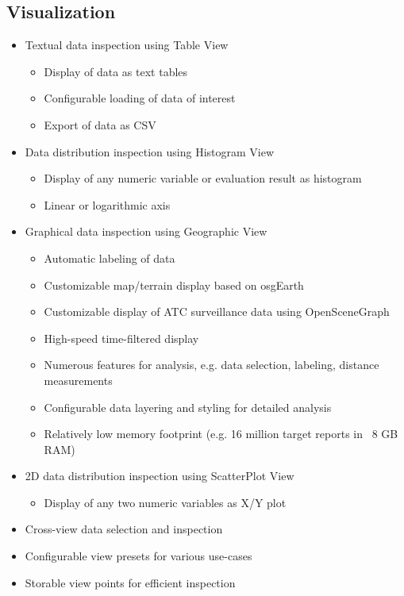 \subsection{Visualization}
\begin{itemize}  
    \item Textual data inspection using Table View
    \begin{itemize}  
        \item Display of data as text tables
        \item Configurable loading of data of interest
        \item Export of data as CSV
    \end{itemize}
    \item Data distribution inspection using Histogram View
    \begin{itemize}  
        \item Display of any numeric variable or evaluation result as histogram
        \item Linear or logarithmic axis
    \end{itemize}
    \item Graphical data inspection using Geographic View
    \begin{itemize}  
        \item Automatic labeling of data
        \item Customizable map/terrain display based on osgEarth
        \item Customizable display of ATC surveillance data using OpenSceneGraph
        \item High-speed time-filtered display
        \item Numerous features for analysis, e.g. data selection, labeling, distance measurements
        \item Configurable data layering and styling for detailed analysis
        \item Relatively low memory footprint (e.g. 16 million target reports in ~8 GB RAM)
    \end{itemize}    
    \item 2D data distribution inspection using ScatterPlot View
    \begin{itemize}  
        \item Display of any two numeric variables as X/Y plot
    \end{itemize}
    \item Cross-view data selection and inspection
    \item Configurable view presets for various use-cases
    \item Storable view points for efficient inspection
\end{itemize}

